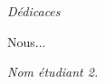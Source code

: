 \begin{center}
\Huge{\emph{Dédicaces}}
\end{center}

\vspace{1cm}

Nous...

\vspace{3cm}
\begin{flushright}
	\textit{Nom étudiant 2.}
\end{flushright}